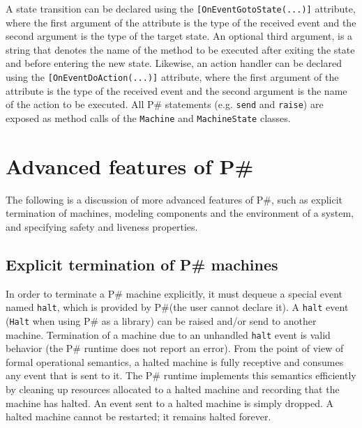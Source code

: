 \documentclass{llncs}
\newcommand{\ps}{P\#\xspace}
\newcommand{\cs}{C\#\xspace}
\begin{document}
A state transition can be declared using the \texttt{[OnEventGotoState(...)]} attribute, where the first argument of the attribute is the type of the received event and the second argument is the type of the target state. An optional third argument, is a string that denotes the name of the method to be executed after exiting the state and before entering the new state. Likewise, an action handler can be declared using the \texttt{[OnEventDoAction(...)]} attribute, where the first argument of the attribute is the type of the received event and the second argument is the name of the action to be executed. All \ps statements (e.g. \texttt{send} and \texttt{raise}) are exposed as method calls of the \texttt{Machine} and \texttt{MachineState} classes.


\section{Advanced features of \ps}
\label{sec:advanced}

The following is a discussion of more advanced features of \ps, such as explicit termination of machines, modeling components and the environment of a system, and specifying safety and liveness properties.

\subsection{Explicit termination of \ps machines}
\label{sec:termination}

In order to terminate a \ps machine explicitly, it must dequeue a special event named \texttt{halt}, which is provided by \ps (the user cannot declare it). A \texttt{halt} event (\texttt{Halt} when using \ps as a library) can be raised and/or send to another machine. Termination of a machine due to an unhandled \texttt{halt} event is valid behavior (the \ps runtime does not report an error). From the point of view of formal operational semantics, a halted machine is fully receptive and consumes any event that is sent to it. The \ps runtime implements this semantics efficiently by cleaning up resources allocated to a halted machine and recording that the machine has halted. An event sent to a halted machine is simply dropped. A halted machine cannot be restarted; it remains halted forever.
\end{document}
